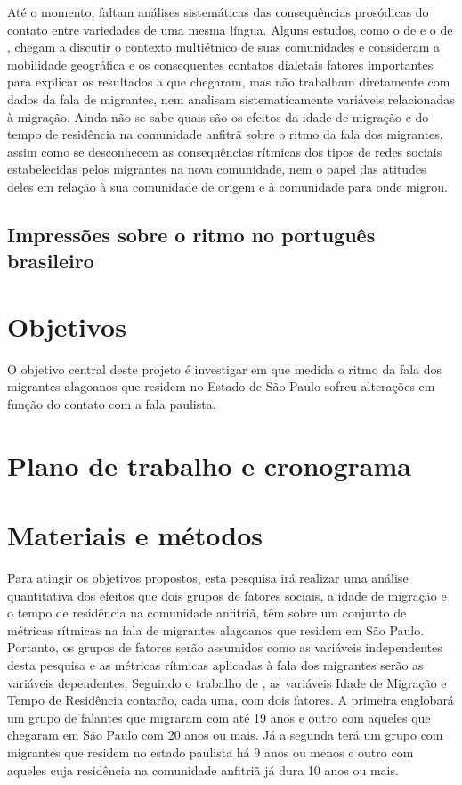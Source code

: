 \documentclass[
	a4paper,	%
	12pt,		%
	]{article}	%
\begin{document}
	Até o momento, faltam análises sistemáticas das consequências prosódicas do contato entre
	variedades de uma mesma língua. Alguns estudos, como o de \citet{Torgersen.Szakay2012} e o de
	\citet{Fagyal2010}, chegam a discutir o contexto multiétnico de suas comunidades e consideram a
	mobilidade geográfica e os consequentes contatos dialetais fatores importantes para explicar os
	resultados a que chegaram, mas não trabalham diretamente com dados da fala de migrantes, nem
	analisam sistematicamente variáveis relacionadas à migração.  Ainda não se sabe quais são os
	efeitos da idade de migração e do tempo de residência na comunidade anfitrã sobre o ritmo da
	fala dos migrantes, assim como se desconhecem as consequências rítmicas dos tipos de redes
	sociais estabelecidas pelos migrantes na nova comunidade, nem o papel das atitudes deles em
	relação à sua comunidade de origem e à comunidade para onde migrou.

	\subsection{Impressões sobre o ritmo no português brasileiro}

\section{Objetivos} \label{objetivos}

O objetivo central deste projeto é investigar em que medida o ritmo da fala dos migrantes alagoanos
que residem no Estado de São Paulo sofreu alterações em função do contato com a fala paulista.

\section{Plano de trabalho e cronograma} \label{plano}
	
\section{Materiais e métodos} 
\label{metodo}

	Para atingir os objetivos propostos, esta pesquisa irá realizar uma análise quantitativa dos
	efeitos que dois grupos de fatores sociais, a idade de migração e o tempo de residência na
	comunidade anfitriã, têm sobre um conjunto de métricas rítmicas na fala de migrantes alagoanos
	que residem em São Paulo. Portanto, os grupos de fatores serão assumidos como as variáveis
	independentes desta pesquisa e as métricas rítmicas aplicadas à fala dos migrantes serão as
	variáveis dependentes. Seguindo o trabalho de \citep{Oushiro2018}, as variáveis Idade de
	Migração e Tempo de Residência contarão, cada uma, com dois fatores. A primeira englobará um
	grupo de falantes que migraram com até 19 anos e outro com aqueles que chegaram em São Paulo com
	20 anos ou mais. Já a segunda terá um grupo com migrantes que residem no estado paulista há 9
	anos ou menos e outro com aqueles cuja residência na comunidade anfitriã já dura 10 anos ou
	mais.
	
\end{document}
